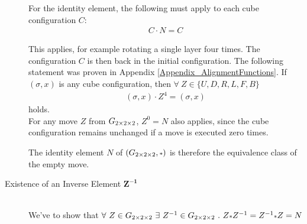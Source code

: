 \begin{description}
For the identity element, the following must apply to each cube configuration $C$:
\begin{align*}
C \cdot N = C
\end{align*}

This applies, for example rotating a single layer four times. The configuration $C$ is then back in the initial configuration. The following statement was proven in Appendix \ref{Appendix_AlignmentFunctions}. If $(\sigma, x)$ is any cube configuration, then $\forall \ Z \in \{U, D, R, L, F, B\} $
\begin{align*}
(\sigma, x) \cdot Z^4 = (\sigma, x)  
\end{align*}
holds. \\
For any move $Z$ from $G_{2\times 2\times 2}$, $Z^0=N$ also applies, since the cube configuration remains unchanged if a move is executed zero times.

The identity element $N$ of $(\Gtwo, \mathlarger{\scriptstyle*})$ is therefore the equivalence class of the empty move.


\item [Existence of an Inverse Element $\boldsymbol{Z^{-1}}$] \ \\
We've to show that $\forall \ Z \in \Gtwo \ \exists \ Z^{-1} \in \Gtwo \ . \ Z \mathlarger{\scriptstyle*} Z^{-1} = Z^{-1} \mathlarger{\scriptstyle*} Z = N$



\end{description}
